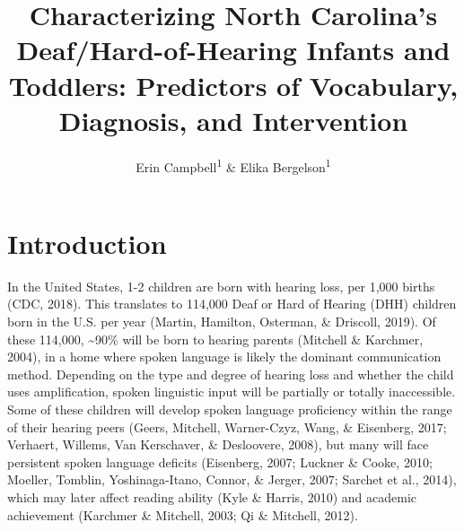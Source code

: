 \documentclass[
  english,
  man]{apa6}
\title{Characterizing North Carolina's Deaf/Hard-of-Hearing Infants and Toddlers: Predictors of Vocabulary, Diagnosis, and Intervention}
\author{Erin Campbell\textsuperscript{1} \& Elika Bergelson\textsuperscript{1}}
\date{}
\affiliation{\vspace{0.5cm}\textsuperscript{1} Duke University}
\begin{document}
\maketitle

\hypertarget{introduction}{%
\section{Introduction}\label{introduction}}

In the United States, 1-2 children are born with hearing loss, per 1,000 births (CDC, 2018). This translates to 114,000 Deaf or Hard of Hearing (DHH) children born in the U.S. per year (Martin, Hamilton, Osterman, \& Driscoll, 2019). Of these 114,000, \textasciitilde90\% will be born to hearing parents (Mitchell \& Karchmer, 2004), in a home where spoken language is likely the dominant communication method. Depending on the type and degree of hearing loss and whether the child uses amplification, spoken linguistic input will be partially or totally inaccessible. Some of these children will develop spoken language proficiency within the range of their hearing peers (Geers, Mitchell, Warner-Czyz, Wang, \& Eisenberg, 2017; Verhaert, Willems, Van Kerschaver, \& Desloovere, 2008), but many will face persistent spoken language deficits (Eisenberg, 2007; Luckner \& Cooke, 2010; Moeller, Tomblin, Yoshinaga-Itano, Connor, \& Jerger, 2007; Sarchet et al., 2014), which may later affect reading ability (Kyle \& Harris, 2010) and academic achievement (Karchmer \& Mitchell, 2003; Qi \& Mitchell, 2012).
\end{document}
